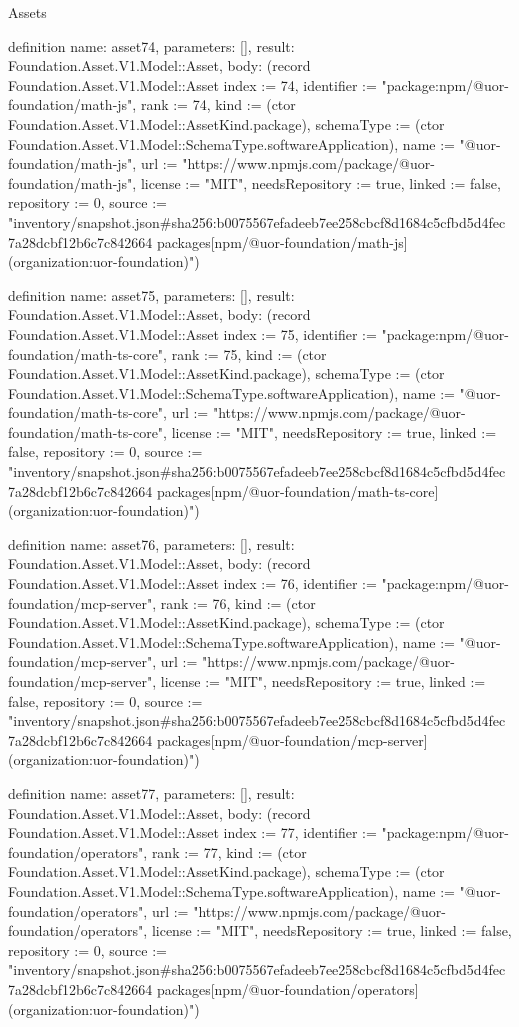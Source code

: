 \begin{lexlean}{Assets}
\begin{semanticmodule}
definition{
  name: asset74,
  parameters: [],
  result: Foundation.Asset.V1.Model::Asset,
  body: (record Foundation.Asset.V1.Model::Asset {index := 74, identifier := "package:npm/@uor-foundation/math-js", rank := 74, kind := (ctor Foundation.Asset.V1.Model::AssetKind.package), schemaType := (ctor Foundation.Asset.V1.Model::SchemaType.softwareApplication), name := "@uor-foundation/math-js", url := "https://www.npmjs.com/package/@uor-foundation/math-js", license := "MIT", needsRepository := true, linked := false, repository := 0, source := "inventory/snapshot.json#sha256:b0075567efadeeb7ee258cbcf8d1684c5cfbd5d4fec7a28dcbf12b6c7c842664 packages[npm/@uor-foundation/math-js] (organization:uor-foundation)"})
}

definition{
  name: asset75,
  parameters: [],
  result: Foundation.Asset.V1.Model::Asset,
  body: (record Foundation.Asset.V1.Model::Asset {index := 75, identifier := "package:npm/@uor-foundation/math-ts-core", rank := 75, kind := (ctor Foundation.Asset.V1.Model::AssetKind.package), schemaType := (ctor Foundation.Asset.V1.Model::SchemaType.softwareApplication), name := "@uor-foundation/math-ts-core", url := "https://www.npmjs.com/package/@uor-foundation/math-ts-core", license := "MIT", needsRepository := true, linked := false, repository := 0, source := "inventory/snapshot.json#sha256:b0075567efadeeb7ee258cbcf8d1684c5cfbd5d4fec7a28dcbf12b6c7c842664 packages[npm/@uor-foundation/math-ts-core] (organization:uor-foundation)"})
}

definition{
  name: asset76,
  parameters: [],
  result: Foundation.Asset.V1.Model::Asset,
  body: (record Foundation.Asset.V1.Model::Asset {index := 76, identifier := "package:npm/@uor-foundation/mcp-server", rank := 76, kind := (ctor Foundation.Asset.V1.Model::AssetKind.package), schemaType := (ctor Foundation.Asset.V1.Model::SchemaType.softwareApplication), name := "@uor-foundation/mcp-server", url := "https://www.npmjs.com/package/@uor-foundation/mcp-server", license := "MIT", needsRepository := true, linked := false, repository := 0, source := "inventory/snapshot.json#sha256:b0075567efadeeb7ee258cbcf8d1684c5cfbd5d4fec7a28dcbf12b6c7c842664 packages[npm/@uor-foundation/mcp-server] (organization:uor-foundation)"})
}

definition{
  name: asset77,
  parameters: [],
  result: Foundation.Asset.V1.Model::Asset,
  body: (record Foundation.Asset.V1.Model::Asset {index := 77, identifier := "package:npm/@uor-foundation/operators", rank := 77, kind := (ctor Foundation.Asset.V1.Model::AssetKind.package), schemaType := (ctor Foundation.Asset.V1.Model::SchemaType.softwareApplication), name := "@uor-foundation/operators", url := "https://www.npmjs.com/package/@uor-foundation/operators", license := "MIT", needsRepository := true, linked := false, repository := 0, source := "inventory/snapshot.json#sha256:b0075567efadeeb7ee258cbcf8d1684c5cfbd5d4fec7a28dcbf12b6c7c842664 packages[npm/@uor-foundation/operators] (organization:uor-foundation)"})
}


\end{semanticmodule}
\end{lexlean}
